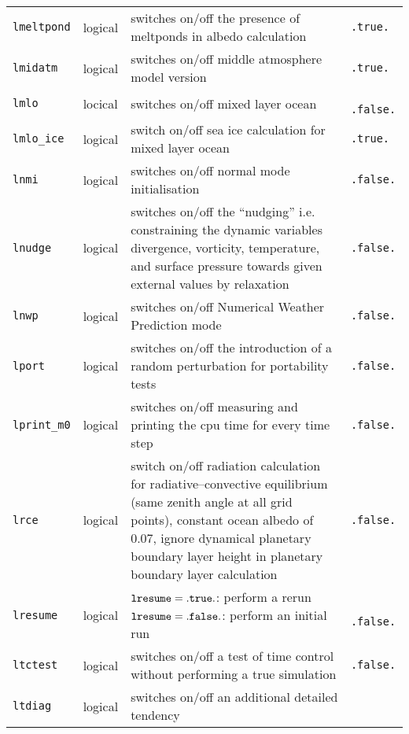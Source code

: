 \begin{longtable}{l@{\extracolsep\fill}lp{}p{3.5cm}}
{\tt lmeltpond}\index{namelist variables!lmeltpond}
 & logical & switches on/off the presence of meltponds
in albedo calculation & {\tt .true.} \\
{\tt lmidatm}\index{namelist variables!lmidatm}
 & logical    &  switches on/off middle atmosphere model
  version & {\tt .true.} \\
{\tt lmlo}\index{namelist variables!lmlo}
 & locical       & switches on/off mixed layer ocean & {\tt
    .false.} \\
{\tt lmlo\_ice}\index{namelist variables!lmlo\_ice} & logical & switch
on/off sea ice calculation for mixed layer ocean & {\tt .true.}\\
{\tt lnmi}\index{namelist variables!lnmi}
 & logical       & switches on/off normal mode initialisation &
  {\tt .false.}\\
{\tt lnudge}\index{namelist variables!lnudge}
 & logical     & switches on/off the ``nudging''
  i.e. constraining the dynamic variables divergence, vorticity,
  temperature, and surface pressure towards given external values by relaxation
  & {\tt .false.} \\
{\tt lnwp}\index{namelist variables!lnwp}
 & logical       & switches on/off Numerical Weather Prediction
  mode & {\tt .false.} \\
{\tt lport}\index{namelist variables!lport}
 & logical      & switches on/off the introduction of a random
  perturbation for portability  tests & {\tt .false.}\\
{\tt lprint\_m0}\index{namelist variables!lprint\_m0}
 & logical & switches on/off measuring and printing
the cpu time for every time step & {\tt .false.}\\
{\tt lrce}\index{namelist variables!lrce} & logical & switch on/off
radiation calculation for radiative--convective equilibrium (same
zenith angle at all grid points), constant
ocean albedo of 0.07, ignore dynamical planetary boundary layer height
in planetary boundary layer calculation & {\tt .false.} \\
{\tt lresume}\index{namelist variables!lresume}
 & logical & ${\tt lresume}={\tt .true.}$: perform a rerun
\newline ${\tt lresume}={\tt .false.}$: perform an initial run & {\tt
  .false.} \\
{\tt ltctest}\index{namelist variables!ltctest}
 & logical & switches on/off a test of time control
 without performing a true simulation& {\tt .false.}\\
{\tt ltdiag}\index{namelist variables!ltdiag}
 & logical     & switches on/off an additional detailed tendency

\end{longtable}
